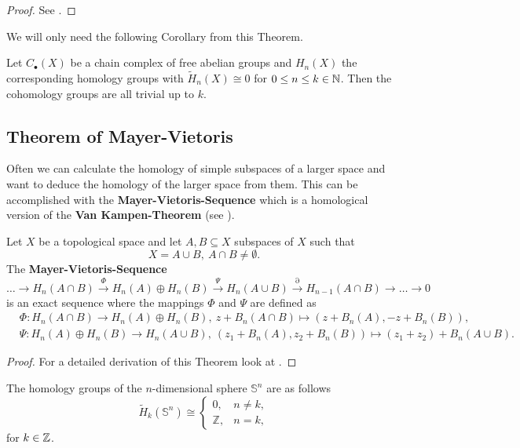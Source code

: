 \begin{proof}
  See \cite[Chapter 3.1]{hatcher}.
\end{proof}

We will only need the following Corollary from this Theorem.

\begin{col}\label{col:hntriv}
  Let $C_\bullet(X)$ be a chain complex of free abelian groups and $H_n(X)$ the corresponding homology groups with $\tilde{H}_n(X) \cong 0$ for $0 \leq n \leq k \in \mathbb{N}$. Then the cohomology groups are all trivial up to $k$. 
\end{col}

\subsection{Theorem of Mayer-Vietoris}
Often we can calculate the homology of simple subspaces of a larger space and want to deduce the homology of the larger space from them.
This can be accomplished with the \textbf{Mayer-Vietoris-Sequence} which is a homological version of the \textbf{Van Kampen-Theorem} (see \cite[Chapter 1.2]{hatcher}).

\begin{thm}\label{thm:mvs}
  Let $X$ be a topological space and let $A, B \subseteq X$ subspaces of $X$ such that \[X = A \cup B, \: A \cap B \neq \emptyset.\]
  The \textbf{Mayer-Vietoris-Sequence}
  \begin{equation*}
    \ldots \to H_n(A\cap B) \overset{\Phi}{\to} H_n(A) \oplus H_n(B) \overset{\Psi}{\to} H_n(A \cup B) \overset{\partial}{\to} H_{n-1}(A\cap B) \to \ldots \to 0
  \end{equation*}
  is an exact sequence where the mappings $\Phi$ and $\Psi$ are defined as
  \begin{align*}
    &\Phi\colon H_n(A\cap B) \to H_n(A) \oplus H_n(B),\: z + B_n(A\cap B) \mapsto (z+B_n(A), -z + B_n(B)), \\
    &\Psi\colon H_n(A) \oplus H_n(B) \to H_n(A\cup B), \: (z_1+ B_n(A), z_2 + B_n(B)) \mapsto (z_1 + z_2) + B_n(A \cup B).
  \end{align*}
\end{thm}

\begin{proof}
  For a detailed derivation of this Theorem look at \cite[p. 149]{hatcher}. 
\end{proof}

\begin{ex}
  The homology groups of the $n$-dimensional sphere $\mathbb{S}^n$ are as follows
  \begin{equation*}
    \tilde{H}_k(\mathbb{S}^n) \cong \begin{cases}
      0, &n \neq k, \\
      \mathbb{Z}, &n = k,
    \end{cases}
  \end{equation*}
  for $k \in \mathbb{Z}$.
\end{ex}


